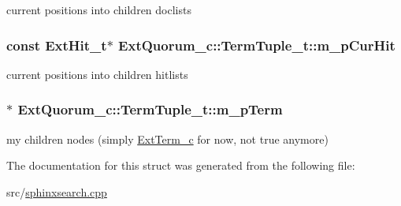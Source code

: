 current positions into children doclists 

\hypertarget{structExtQuorum__c_1_1TermTuple__t_a2f9e78351ddec1091533fbe5e434da74}{
\subsubsection[{m\-\_\-p\-Cur\-Hit}]{\setlength{\rightskip}{0pt plus 5cm}const {\bf Ext\-Hit\-\_\-t}$\ast$ Ext\-Quorum\-\_\-c\-::\-Term\-Tuple\-\_\-t\-::m\-\_\-p\-Cur\-Hit}}\label{structExtQuorum__c_1_1TermTuple__t_a2f9e78351ddec1091533fbe5e434da74}


current positions into children hitlists 

\hypertarget{structExtQuorum__c_1_1TermTuple__t_a3a43f9e9499d379ee9ef3c30a64a1b4d}{
\subsubsection[{m\-\_\-p\-Term}]{$\ast$ Ext\-Quorum\-\_\-c\-::\-Term\-Tuple\-\_\-t\-::m\-\_\-p\-Term}}\label{structExtQuorum__c_1_1TermTuple__t_a3a43f9e9499d379ee9ef3c30a64a1b4d}


my children nodes (simply \hyperlink{classExtTerm__c}{Ext\-Term\-\_\-c} for now, not true anymore) 



The documentation for this struct was generated from the following file\-:\begin{DoxyCompactItemize}
\item 
src/\hyperlink{sphinxsearch_8cpp}{sphinxsearch.\-cpp}\end{DoxyCompactItemize}
